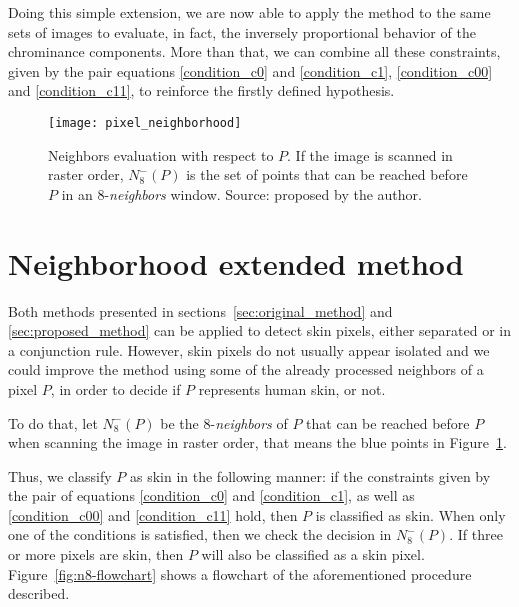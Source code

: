 Doing this simple extension, we are now able to apply the method to the same sets of images to evaluate, in fact, the inversely proportional behavior of the chrominance components. More than that, we can combine all these constraints, given by the pair equations \ref{condition_c0} and \ref{condition_c1}, \ref{condition_c00} and \ref{condition_c11}, to reinforce the firstly defined hypothesis.


\begin{figure}[!htp]
    \centering
    \texttt{[image: pixel\_neighborhood]}
    \caption[Neighbors evaluation with respect to a pixel $P$]{Neighbors evaluation with respect to $P$. If the image is scanned in raster order, $N_8^-(P)$ is the set of points that can be reached before $P$ in an 8-\textit{neighbors} window. Source: proposed by the author.}
    \label{fig:pixel_neighborhood}
\end{figure}


\section{Neighborhood extended method}
\label{sec:neighborhood_extended_method}
Both methods presented in sections~\ref{sec:original_method} and \ref{sec:proposed_method} can be applied to detect skin pixels, either separated or in a conjunction rule. However, skin pixels do not usually appear isolated and we could improve the method using some of the already processed neighbors of a pixel $P$, in order to decide if $P$ represents human skin, or not.

To do that, let $N_8^-(P)$ be the 8-\textit{neighbors} of $P$ that can be reached before $P$ when scanning the image in raster order, that means the blue points in Figure~\ref{fig:pixel_neighborhood}. %

Thus, we classify $P$ as skin in the following manner: if the constraints given by the pair of equations \ref{condition_c0} and \ref{condition_c1}, as well as \ref{condition_c00} and \ref{condition_c11} hold, then $P$ is classified as skin. When only one of the conditions is satisfied, then we check the decision in $N_8^-(P)$. If three or more pixels are skin, then $P$ will also be classified as a skin pixel. Figure~\ref{fig:n8-flowchart} shows a flowchart of the aforementioned procedure described.

